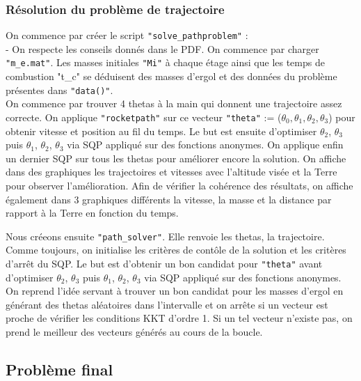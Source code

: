 \subsubsection{Résolution du problème de trajectoire}\medbreak

On commence par créer le script \texttt{"solve\_pathproblem"} : \\
\indent - On respecte les conseils donnés dans le PDF. On commence par charger \texttt{"m\_e.mat"}. Les masses initiales \texttt{"Mi"} à chaque étage ainsi que les temps de combustion "t\_c" se déduisent des masses d'ergol et des données du problème présentes dans \texttt{"data()"}.\\
On commence par trouver 4 thetas à la main qui donnent une trajectoire assez correcte. On applique \texttt{"rocketpath"} sur ce vecteur \texttt{"theta"} := ($\theta_0,\theta_1,\theta_2,\theta_3$) pour obtenir vitesse et position au fil du temps. Le but est ensuite d'optimiser $\theta_2$, $\theta_3$ puis $\theta_1$, $\theta_2$, $\theta_3$ via SQP appliqué sur des fonctions anonymes. On applique enfin un dernier SQP sur tous les thetas pour améliorer encore la solution. On affiche dans des graphiques les trajectoires et vitesses avec l'altitude visée et la Terre pour observer l'amélioration. Afin de vérifier la cohérence des résultats, on affiche également dans 3 graphiques différents la vitesse, la masse et la distance par rapport à la Terre en fonction du temps.\medbreak

Nous créeons ensuite \texttt{"path\_solver"}. Elle renvoie les thetas, la trajectoire. Comme toujours, on initialise les critères de contôle de la solution et les critères d'arrêt du SQP. Le but est d'obtenir un bon candidat pour \texttt{"theta"} avant d'optimiser $\theta_2$, $\theta_3$ puis $\theta_1$, $\theta_2$, $\theta_3$ via SQP appliqué sur des fonctions anonymes. On reprend l'idée servant à trouver un bon candidat pour les masses d'ergol en générant des thetas aléatoires dans l'intervalle et on arrête si un vecteur est proche de vérifier les conditions KKT d'ordre 1. Si un tel vecteur n'existe pas, on prend le meilleur des vecteurs générés au cours de la boucle.\medbreak

\subsection{Problème final}\medbreak

